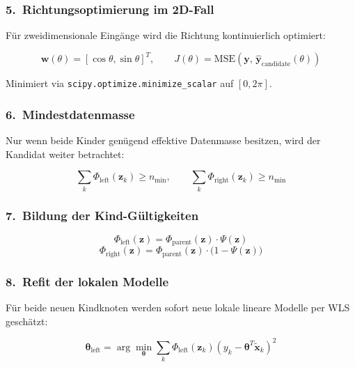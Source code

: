 \documentclass[11pt,a4paper]{report}
\begin{document}
	\subsubsection*{5.~Richtungsoptimierung im 2D-Fall}
	
	Für zweidimensionale Eingänge wird die Richtung kontinuierlich optimiert:
	
	\begin{equation}
		\mathbf{w}(\theta) = [\cos\theta, \sin\theta]^T, \qquad
		J(\theta) = \mathrm{MSE}(\mathbf{y},\, \hat{\mathbf{y}}_{\mathrm{candidate}}(\theta))
	\end{equation}
	
	Minimiert via \texttt{scipy.optimize.minimize\_scalar} auf $[0, 2\pi]$.
	
	\subsubsection*{6.~Mindestdatenmasse}
	
	Nur wenn beide Kinder genügend effektive Datenmasse besitzen, wird der Kandidat weiter betrachtet:
	
	\begin{equation}
		\sum_k \Phi_{\mathrm{left}}(\mathbf{z}_k) \geq n_{\min}, \qquad
		\sum_k \Phi_{\mathrm{right}}(\mathbf{z}_k) \geq n_{\min}
	\end{equation}
	
	\subsubsection*{7.~Bildung der Kind-Gültigkeiten}
	
	\begin{equation}
		\Phi_{\mathrm{left}}(\mathbf{z}) = \Phi_{\mathrm{parent}}(\mathbf{z}) \cdot \Psi(\mathbf{z})
	\end{equation}
	\begin{equation}
		\Phi_{\mathrm{right}}(\mathbf{z}) = \Phi_{\mathrm{parent}}(\mathbf{z}) \cdot \bigl(1 - \Psi(\mathbf{z})\bigr)
	\end{equation}
	
	\subsubsection*{8.~Refit der lokalen Modelle}
	
	Für beide neuen Kindknoten werden sofort neue lokale lineare Modelle per WLS geschätzt:
	
	\begin{equation}
		\boldsymbol{\theta}_{\mathrm{left}} = \arg\min_{\boldsymbol{\theta}} \sum_k \Phi_{\mathrm{left}}(\mathbf{z}_k) \left(y_k - \boldsymbol{\theta}^T \tilde{\mathbf{x}}_k\right)^2
	\end{equation}
	
\end{document}
